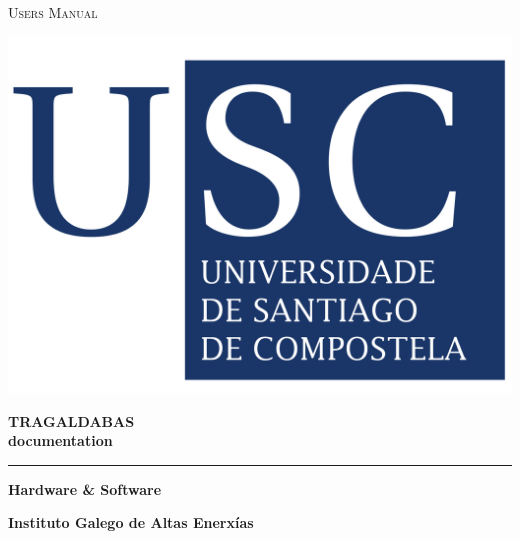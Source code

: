 \documentclass{book}
\begin{document}
\begin{titlepage}
	\par
	\centering
	\vspace{1cm}
	
\begin{minipage}[b]{0.5\linewidth}
\centering
	{\scshape\LARGE Users Manual}
	\vspace{40pt}
\end{minipage}
\begin{minipage}[b]{0.4\linewidth}
\includegraphics[height=8\baselineskip]{LogoUSC}
\end{minipage}

	\vspace{1.5cm}
	{\huge\bfseries TRAGALDABAS\\documentation\par}
	\vspace{0.25cm}
	
	\noindent\rule{\textwidth}{1pt}
	
	\vspace{0.25cm}
	{\huge\bfseries Hardware \& Software\par}
	
	\vspace{2cm}
	
	{\large\bfseries Instituto Galego de Altas Enerxías\par}
	\vspace{1cm}

%
%


\end{titlepage}
\end{document}
